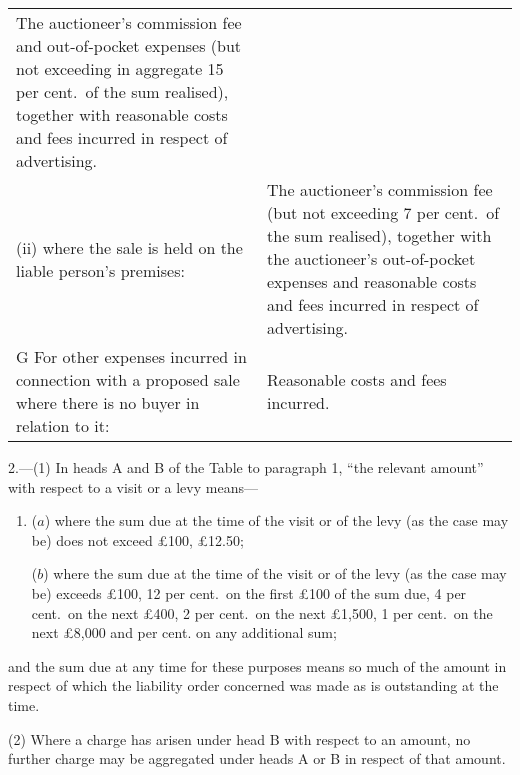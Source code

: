 \documentclass[12pt,a4paper]{article}
\begin{document}
{\begin{longtable}{p{183pt}p{183pt}}
The auctioneer’s commission fee and out-of-pocket expenses (but not exceeding in aggregate 15 per cent.\ of the sum realised), together with reasonable costs and fees incurred in respect of advertising.\\
\hspace{12pt}(ii) where the sale is held on the liable person’s premises:&
The auctioneer’s commission fee (but not exceeding 7\textonehalf{} per cent.\ of the sum realised), together with the auctioneer’s out-of-pocket expenses and reasonable costs and fees incurred in respect of advertising.\\
G {} For other expenses incurred in connection with a proposed sale where there is no buyer in relation to it:&
Reasonable costs and fees incurred.\\
\end{longtable}

}


\medskip

2.—(1) In heads A and B of the Table to paragraph 1, “the relevant amount” with respect to a visit or a levy means—
\begin{enumerate}\item[]
($a$) where the sum due at the time of the visit or of the levy (as the case may be) does not exceed £100, £12.50;

($b$) where the sum due at the time of the visit or of the levy (as the case may be) exceeds £100, 12\textonehalf{} per cent.\ on the first £100 of the sum due, 4 per cent.\ on the next £400, 2\textonehalf{} per cent.\ on the next £1,500, 1 per cent.\ on the next £8,000 and \textonequarter{} per cent. on any additional sum;
\end{enumerate}
and the sum due at any time for these purposes means so much of the amount in respect of which the liability order concerned was made as is outstanding at the time.

(2) Where a charge has arisen under head B with respect to an amount, no further charge may be aggregated under heads A or B in respect of that amount.
\end{document}
